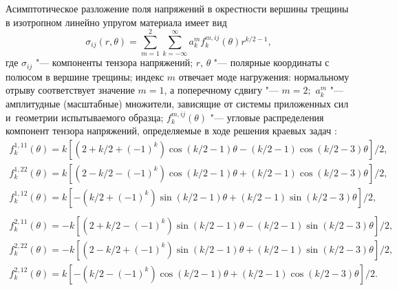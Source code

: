 \smallskip


Асимптотическое разложение поля напряжений в окрестности вершины трещины в изотропном линейно упругом материала имеет вид
\begin{equation}
\sigma _{ij}(r,\theta)=\sum_{m=1}^{2}\sum _{k=-\infty}^{\infty}a_k^mf^{m,ij}_{k}(\theta)r^{k/2-1},
\label{solution9}
\end{equation}
где  $\sigma _{ij}$ "--- компоненты тензора напряжений; 
$r$, $\theta$ "--- полярные координаты с полюсом в вершине трещины; 
индекс $m$ отвечает моде нагружения: нормальному отрыву соответствует значение $m=1$, а поперечному сдвигу "--- $m=2;$ 
$a_k^m$ "--- амплитудные (масштабные) множители, зависящие от системы приложенных сил и~геометрии испытываемого образца;
 $f_k^{m,ij} (\theta )$ "--- угловые распределения компонент тензора напряжений, определяемые в ходе решения краевых задач \cite{Hello}:
\begin{equation}
\begin{array}{l}
f_k^{1,11}(\theta)=k\left
[(2+k/2+(-1)^k)\cos(k/2-1)\theta-(k/2-1)\cos (k/2-3)\theta\right ]/2,\\[2mm]
f_k^{1,22}(\theta)=k\left
[(2-k/2-(-1)^k)\cos(k/2-1)\theta+(k/2-1)\cos (k/2-3)\theta\right
]/2,\\[2mm]
f_k^{1,12}(\theta)=k\left
[-(k/2+(-1)^k)\sin(k/2-1)\theta+(k/2-1)\sin (k/2-3)\theta\right
]/2,\\[2mm]
\end{array}
\end{equation}
\begin{equation}
\begin{array}{l}
f_k^{2,11}(\theta)=-k\left
[(2+k/2-(-1)^k)\sin(k/2-1)\theta-(k/2-1)\sin (k/2-3)\theta\right ]/2,\\[2mm]
f_k^{2,22}(\theta)=-k\left
[(2-k/2+(-1)^k)\sin(k/2-1)\theta+(k/2-1)\sin (k/2-3)\theta\right
]/2,\\[2mm]
f_k^{2,12}(\theta)=k\left
[-(k/2-(-1)^k)\cos(k/2-1)\theta+(k/2-1)\cos (k/2-3)\theta\right
]/2.
\end{array}
\end{equation}

